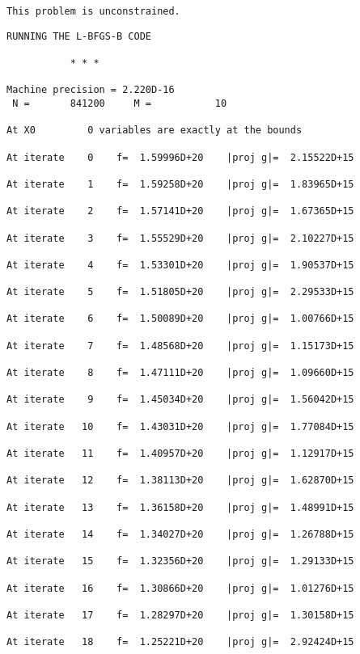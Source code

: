 \documentclass[11pt]{article}
\begin{document}
    \begin{Verbatim}[commandchars=\\\{\}]
 This problem is unconstrained.
    \end{Verbatim}

    \begin{Verbatim}[commandchars=\\\{\}]
RUNNING THE L-BFGS-B CODE

           * * *

Machine precision = 2.220D-16
 N =       841200     M =           10

At X0         0 variables are exactly at the bounds

At iterate    0    f=  1.59996D+20    |proj g|=  2.15522D+15

At iterate    1    f=  1.59258D+20    |proj g|=  1.83965D+15

At iterate    2    f=  1.57141D+20    |proj g|=  1.67365D+15

At iterate    3    f=  1.55529D+20    |proj g|=  2.10227D+15

At iterate    4    f=  1.53301D+20    |proj g|=  1.90537D+15

At iterate    5    f=  1.51805D+20    |proj g|=  2.29533D+15

At iterate    6    f=  1.50089D+20    |proj g|=  1.00766D+15

At iterate    7    f=  1.48568D+20    |proj g|=  1.15173D+15

At iterate    8    f=  1.47111D+20    |proj g|=  1.09660D+15

At iterate    9    f=  1.45034D+20    |proj g|=  1.56042D+15

At iterate   10    f=  1.43031D+20    |proj g|=  1.77084D+15

At iterate   11    f=  1.40957D+20    |proj g|=  1.12917D+15

At iterate   12    f=  1.38113D+20    |proj g|=  1.62870D+15

At iterate   13    f=  1.36158D+20    |proj g|=  1.48991D+15

At iterate   14    f=  1.34027D+20    |proj g|=  1.26788D+15

At iterate   15    f=  1.32356D+20    |proj g|=  1.29133D+15

At iterate   16    f=  1.30866D+20    |proj g|=  1.01276D+15

At iterate   17    f=  1.28297D+20    |proj g|=  1.30158D+15

At iterate   18    f=  1.25221D+20    |proj g|=  2.92424D+15


\end{Verbatim}
\end{document}
